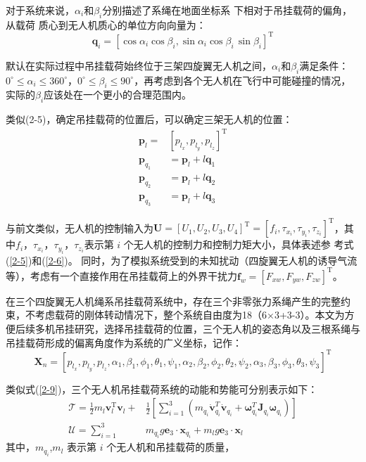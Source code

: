 \documentclass[lang=chs, degree=master, blindreview=false, winfonts=true]{yanputhesis}
\begin{document}
对于系统来说，$\alpha_{i}$和$\beta_i$分别描述了系绳在地面坐标系 下相对于吊挂载荷的偏角，从载荷
质心到无人机质心的单位方向向量为：
\begin{equation}
	\boldsymbol{q}_i=\left[\cos\alpha_i\cos\beta_i,\sin\alpha_i\cos\beta_i\,\sin\beta_i\right]^\mathrm T
\end{equation}

默认在实际过程中吊挂载荷始终位于三架四旋翼无人机之间，$\alpha_{i}$和$\beta_i$满足条件：
$0^\circ\leq\alpha_i\leq360^\circ$，$0^\circ\leq\beta_i\leq90^\circ$，再考虑到各个无人机在飞行中可能碰撞的情况，实际的$\beta_i$应该处在一个更小的合理范围内。

类似(2-5)，确定吊挂载荷的位置后，可以确定三架无人机的位置：
\begin{equation}
\begin{aligned}
	\boldsymbol{p}_{l}=&\left[p_{l_{x}},p_{l_{y}},p_{l_{z}}\right]^{\mathrm{T}} \\
	\boldsymbol{p}_{q_1}&=\boldsymbol{p}_l+l\boldsymbol{q}_1 \\
	\boldsymbol{p}_{q_2}&=\boldsymbol{p}_{l}+l\boldsymbol{q}_{2} \\
	\boldsymbol{p}_{q_3}&=\boldsymbol{p}_l+l\boldsymbol{q}_3
\end{aligned}
\end{equation}

与前文类似，无人机的控制输入为$\bm{U}=\left[U_1,U_2,U_3,U_4\right]^\mathrm{T}=\left[f_i,\tau_{x_i},\tau_{y_i},\tau_{z_i}\right]^\mathrm{T}$，其中$f_{i}$，$\tau_{x_i}$，$\tau_{y_i}$，$\tau_{z_i}$表示第 $i$ 个无人机的控制力和控制力矩大小，具体表述参
考式(\ref{2-5})和(\ref{2-6})。
同时，为了模拟系统受到的未知扰动（四旋翼无人机的诱导气流等），考虑有一个直接作用在吊挂载荷上的外界干扰力${\boldsymbol{f}}_{w}=\left[F_{xw},F_{yw},F_{zw}\right]^\mathrm{T}$。

在三个四旋翼无人机绳系吊挂载荷系统中，存在三个非零张力系绳产生的完整约束，不考虑载荷的刚体转动情况下，整个系统自由度为18（6×3+3-3）。本文为方便后续多机吊挂研究，选择吊挂载荷的位置，三个无人机的姿态角以及三根系绳与吊挂载荷形成的偏离角度作为系统的广义坐标，记作：
$$\boldsymbol{X}_n=
\left[
	p_{l_x} , p_{l_y} , p_{l_z},\alpha_1,\beta_1,\phi_1,\theta_1,\psi_1,\alpha_2,\beta_2,\phi_2,\theta_2,\psi_2,\alpha_3,\beta_3,\phi_3,\theta_3,\psi_3
\right]^\mathrm T$$

类似式(\ref{2-9})，三个无人机吊挂载荷系统的动能和势能可分别表示如下：
\begin{equation}
	\begin{aligned}
	\mathcal{T}=\frac{1}{2}m_{l}{\boldsymbol{v}}_{l}^\mathrm{T}{\boldsymbol{v}}_{l}+&\frac{1}{2}\left[\sum_{i=1}^{3}\left(m_{q_{i}}\dot{\boldsymbol{v}}_{q_{i}}^{T}\dot{\boldsymbol{v}}_{q_{i}}+\boldsymbol{\omega}_{q_{i}}^{T}\boldsymbol{J}_{q_{i}}\boldsymbol{\omega}_{q_{i}}\right)\right] \\
	\mathcal{U}=\sum_{i=1}^{3}&m_{q_{i}}g\boldsymbol{e}_3\cdot\boldsymbol{x}_{q_{i}}+m_{l}g\boldsymbol{e}_3\cdot\boldsymbol{x}_{l}
\end{aligned}
\label{2-18}
\end{equation}
其中，$m_{q_{i}}$,$m_l$ 表示第 $i$ 个无人机和吊挂载荷的质量，
\end{document}
